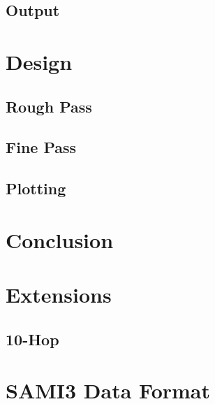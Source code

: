 \documentclass[12pt,letterpaper]{article}
\begin{document}
\subsection{Output}
\label{sec:usage:output}

%
%
\section{Design}
\label{sec:design}

\subsection{Rough Pass}
\label{sec:design:rough}

\subsection{Fine Pass}
\label{sec:design:fine}

\subsection{Plotting}
\label{sec:design:plotting}

%
%
\section{Conclusion}
\label{sec:conclusion}

%
%
\newpage
\renewcommand{\bibname}{References}



\newpage
\begin{appendices}

  \section{Extensions}
  \label{sec:extensions}

  \subsection{10-Hop}
  \label{sec:extensions:10hop}

  \section{SAMI3 Data Format}
  \label{sec:sami3_df}

\end{appendices}
\end{document}
